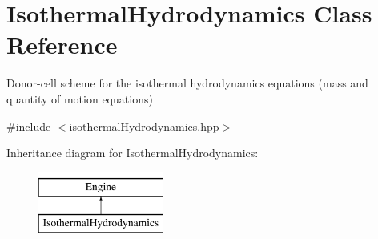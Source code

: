 \hypertarget{classIsothermalHydrodynamics}{}\section{Isothermal\+Hydrodynamics Class Reference}
\label{classIsothermalHydrodynamics}


Donor-\/cell scheme for the isothermal hydrodynamics equations (mass and quantity of motion equations)  




{\ttfamily \#include $<$isothermal\+Hydrodynamics.\+hpp$>$}

Inheritance diagram for Isothermal\+Hydrodynamics\+:\begin{figure}[H]
\begin{center}
\leavevmode
\includegraphics[height=2.000000cm]{classIsothermalHydrodynamics}
\end{center}
\end{figure}

